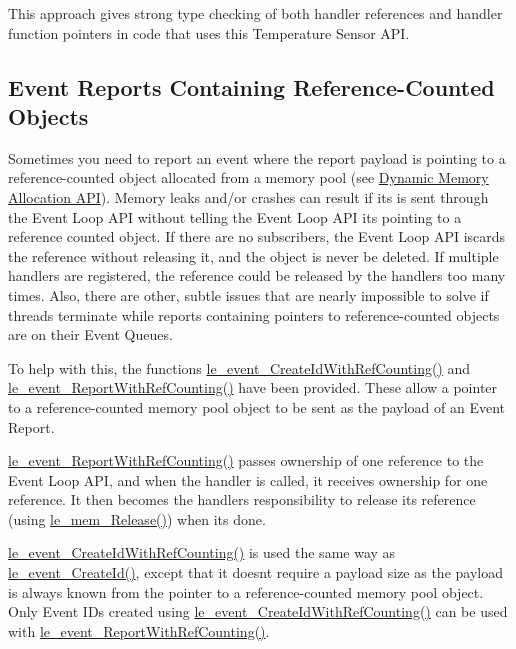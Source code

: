 This approach gives strong type checking of both handler references and handler function pointers in code that uses this Temperature Sensor A\+P\+I.\hypertarget{c_event_loop_c_event_reportingRefCountedObjects}{}\subsection{Event Reports Containing Reference-\/\+Counted Objects}\label{c_event_loop_c_event_reportingRefCountedObjects}
Sometimes you need to report an event where the report payload is pointing to a reference-\/counted object allocated from a memory pool (see \hyperlink{c_memory}{Dynamic Memory Allocation A\+P\+I}). Memory leaks and/or crashes can result if its is sent through the Event Loop A\+P\+I without telling the Event Loop A\+P\+I it\textquotesingle{}s pointing to a reference counted object. If there are no subscribers, the Event Loop A\+P\+I iscards the reference without releasing it, and the object is never be deleted. If multiple handlers are registered, the reference could be released by the handlers too many times. Also, there are other, subtle issues that are nearly impossible to solve if threads terminate while reports containing pointers to reference-\/counted objects are on their Event Queues.

To help with this, the functions {\ttfamily \hyperlink{le__event_loop_8h_a31bef8276ad0e911fd84fb710d58ca2b}{le\+\_\+event\+\_\+\+Create\+Id\+With\+Ref\+Counting()}} and {\ttfamily \hyperlink{le__event_loop_8h_af0277165493b512216fabb6086ec7d9c}{le\+\_\+event\+\_\+\+Report\+With\+Ref\+Counting()}} have been provided. These allow a pointer to a reference-\/counted memory pool object to be sent as the payload of an Event Report.

{\ttfamily \hyperlink{le__event_loop_8h_af0277165493b512216fabb6086ec7d9c}{le\+\_\+event\+\_\+\+Report\+With\+Ref\+Counting()}} passes ownership of one reference to the Event Loop A\+P\+I, and when the handler is called, it receives ownership for one reference. It then becomes the handler\textquotesingle{}s responsibility to release its reference (using \hyperlink{le__mem_8h_a6d8e3fe430bcb81efe97b57ce30ef2de}{le\+\_\+mem\+\_\+\+Release()}) when it\textquotesingle{}s done.

{\ttfamily \hyperlink{le__event_loop_8h_a31bef8276ad0e911fd84fb710d58ca2b}{le\+\_\+event\+\_\+\+Create\+Id\+With\+Ref\+Counting()}} is used the same way as \hyperlink{le__event_loop_8h_a41a96eb3affb07184b519164cf54e213}{le\+\_\+event\+\_\+\+Create\+Id()}, except that it doesn\textquotesingle{}t require a payload size as the payload is always known from the pointer to a reference-\/counted memory pool object. Only Event I\+Ds created using \hyperlink{le__event_loop_8h_a31bef8276ad0e911fd84fb710d58ca2b}{le\+\_\+event\+\_\+\+Create\+Id\+With\+Ref\+Counting()} can be used with \hyperlink{le__event_loop_8h_af0277165493b512216fabb6086ec7d9c}{le\+\_\+event\+\_\+\+Report\+With\+Ref\+Counting()}.


